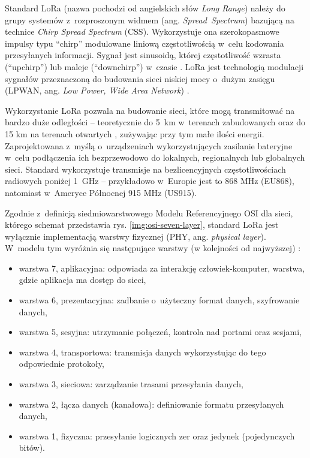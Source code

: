 Standard LoRa (nazwa pochodzi od angielskich słów \textsl{Long Range}) należy do grupy systemów z~rozproszonym widmem
(ang. \textsl{Spread~Spectrum}) bazującą na technice \textsl{Chirp Spread Spectrum} (CSS). Wykorzystuje ona
szerokopasmowe impulsy typu \enquote{chirp} modulowane liniową częstotliwością w~celu kodowania przesyłanych informacji.
Sygnał jest sinusoidą, której częstotliwość wzrasta (\enquote{upchirp}) lub maleje (\enquote{downchirp}) w~czasie
\cite{semtech-lora-lorawan,ieee-802-15-4-2006}. LoRa jest technologią modulacji sygnałów przeznaczoną do budowania sieci
niskiej mocy o~dużym zasięgu (LPWAN, ang. \textsl{Low Power, Wide Area Network}) \cite{long-range-unlicensed}.

Wykorzystanie LoRa pozwala na budowanie sieci, które mogą transmitować na bardzo duże odległości -- teoretycznie do 5~km
w~terenach zabudowanych oraz do 15 km na terenach otwartych \cite{semtech-lora-lorawan}, zużywając przy tym małe ilości
energii. Zaprojektowana z~myślą o~urządzeniach wykorzystujących zasilanie bateryjne w~celu podłączenia ich bezprzewodowo
do lokalnych, regionalnych lub globalnych sieci. Standard wykorzystuje transmisje na bezlicencyjnych częstotliwościach
radiowych poniżej 1~GHz -- przykładowo w~Europie jest to 868 MHz (EU868), natomiast w~Ameryce Północnej 915 MHz (US915).

Zgodnie z~definicją siedmiowarstwowego Modelu Referencyjnego OSI dla sieci, którego schemat przedstawia rys.
\ref{img:osi-seven-layer}, standard LoRa jest wyłącznie implementacją warstwy fizycznej (PHY, ang. \textsl{physical
    layer}). W~modelu tym wyróżnia się następujące warstwy (w kolejności od najwyższej) \cite{osi-model}:
\begin{itemize}[label=--]
    \item warstwa 7, aplikacyjna: odpowiada za interakcję człowiek-komputer, warstwa, gdzie aplikacja ma dostęp do sieci,
    \item warstwa 6, prezentacyjna: zadbanie o~użyteczny format danych, szyfrowanie danych,
    \item warstwa 5, sesyjna: utrzymanie połączeń, kontrola nad portami oraz sesjami,
    \item warstwa 4, transportowa: transmisja danych wykorzystując do tego odpowiednie protokoły,
    \item warstwa 3, sieciowa: zarządzanie trasami przesyłania danych,
    \item warstwa 2, łącza danych (kanałowa): definiowanie formatu przesyłanych danych,
    \item warstwa 1, fizyczna: przesyłanie logicznych zer oraz jedynek (pojedynczych bitów).
\end{itemize}

